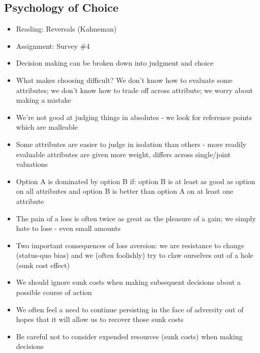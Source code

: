 \documentclass[12pt]{article}
\begin{document}
\subsection{Psychology of Choice}
\begin{itemize}
\item Reading: Reversals (Kahneman)
\item Assignment: Survey \#4
\item Decision making can be broken down into judgment and choice 
\item What makes choosing difficult? We don't know how to evaluate some attributes; we don't know how to trade off across attribute; we worry about making a mistake 
\item We're not good at judging things in absolutes - we look for reference points which are malleable 
\item Some attributes are easier to judge in isolation than others - more readily evaluable attributes are given more weight, differs across single/joint valuations 
\item Option A is dominated by option B if: option B is at least as good as option  on all attributes and option B is better than option A on at least one attribute 
\item The pain of a loss is often twice as great as the pleasure of a gain; we simply hate to lose - even small amounts 
\item Two important consequences of loss aversion: we are resistance to change (status-quo bias) and we (often foolishly) try to claw ourselves out of a hole (sunk cost effect) 
\item We should ignore sunk costs when making subsequent decisions about a possible course of action
\item We often feel a need to continue persisting in the face of adversity out of hopes that it will allow us to recover those sunk costs 
\item Be careful not to consider expended resources (sunk costs) when making decisions 
\end{itemize}
\newpage
\end{document}
